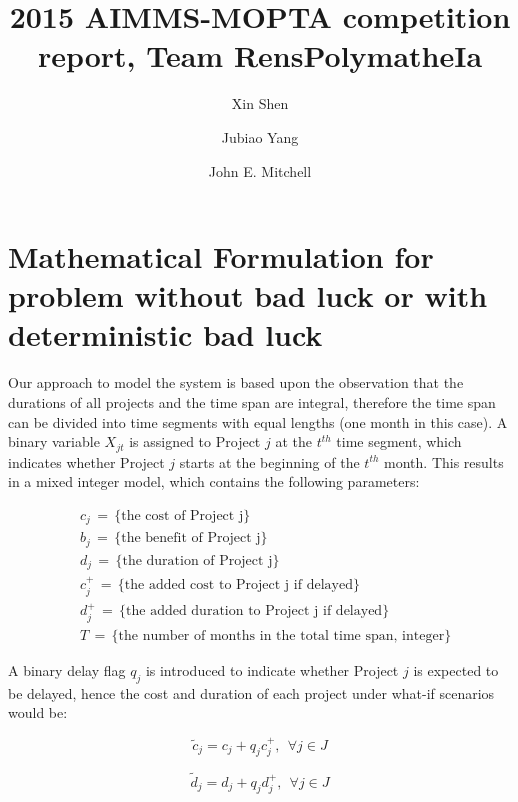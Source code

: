 \documentclass[final,3p,times]{elsarticle}
\begin{document}
\begin{frontmatter}

\title{2015 AIMMS-MOPTA competition report, Team RensPolymatheIa}

\author[rvt]{Xin Shen}
\author[rvt]{Jubiao Yang}
\author[rvt]{John E. Mitchell}

\address[rvt]{Rensselaer Polytechnic Institute, Troy, NY 12180}


\end{frontmatter}

\section{Mathematical Formulation for problem without bad luck or with deterministic bad luck}
Our approach to model the system is based upon the observation that the durations of all projects and the time span are integral, therefore the time span can be divided into time segments with equal lengths (one month in this case). A binary variable $X_{jt}$ is assigned to Project $j$ at the $t^{th}$ time segment, which indicates whether Project $j$ starts at the beginning of the $t^{th}$ month. This results in a mixed integer model, which contains the following parameters:

\begin{align*}
	&c_j\,=\, \{\mbox{the cost of Project j}\}\\
	&b_j\,=\, \{\mbox{the benefit of Project j}\}\\
	&d_j\,=\, \{\mbox{the duration of Project j}\}\\
	&c^+_j\,=\, \{\mbox{the added cost to Project j if delayed}\}\\
	&d^+_j\,=\, \{\mbox{the added duration to Project j if delayed}\}\\
	&T \,=\, \{\mbox{the number of months in the total time span, integer}\}
\end{align*}

A binary delay flag $q_j$ is introduced to indicate whether Project $j$ is expected to be delayed, hence the cost and duration of each project under what-if scenarios would be:

\begin{equation}
	\tilde{c}_j = c_j + q_j c^+_j,~~\forall j \in J
\end{equation}

\begin{equation}
	\tilde{d}_j = d_j + q_j d^+_j,~~\forall j \in J
\end{equation}
\end{document}
